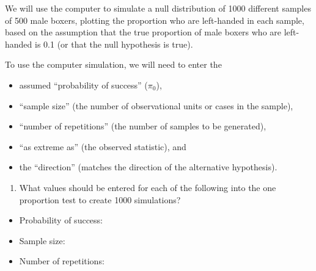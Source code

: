 \documentclass[
]{report}
\providecommand{\tightlist}{%
  \setlength{\itemsep}{0pt}\setlength{\parskip}{0pt}}
\begin{document}
\vspace{1in}

We will use the computer to simulate a null distribution of 1000 different samples of 500 male boxers, plotting the proportion who are left-handed in each sample, based on the assumption that the true proportion of male boxers who are left-handed is 0.1 (or that the null hypothesis is true).

To use the computer simulation, we will need to enter the

\begin{itemize}
\tightlist
\item
  assumed ``probability of success'' (\(\pi_0\)),
\item
  ``sample size'' (the number of observational units or cases in the sample),
\item
  ``number of repetitions'' (the number of samples to be generated),
\item
  ``as extreme as'' (the observed statistic), and
\item
  the ``direction'' (matches the direction of the alternative hypothesis).
\end{itemize}

\begin{enumerate}
\def\labelenumi{\arabic{enumi}.}
\setcounter{enumi}{17}
\tightlist
\item
  What values should be entered for each of the following into the one proportion test to create 1000 simulations?
\end{enumerate}

\vspace{1mm}

\begin{itemize}
\tightlist
\item
  Probability of success:
\end{itemize}

\vspace{.2in}

\begin{itemize}
\tightlist
\item
  Sample size:
\end{itemize}

\vspace{.2in}

\begin{itemize}
\tightlist
\item
  Number of repetitions:
\end{itemize}

\vspace{.2in}
\end{document}
